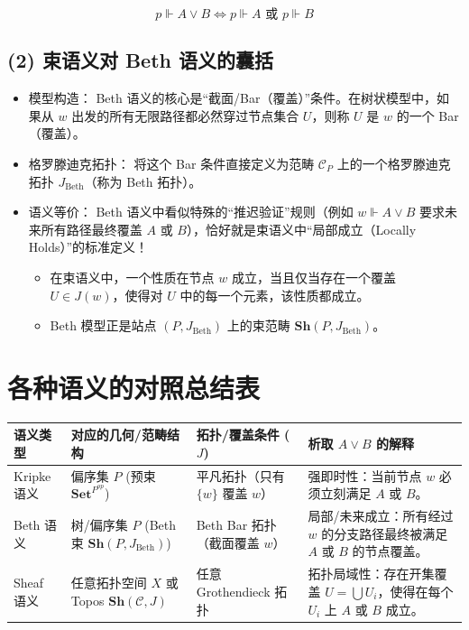 \documentclass[12pt,a4paper]{article}
\begin{document}
\[
p \Vdash A \lor B \iff p \Vdash A \text{ 或 } p \Vdash B
\]

\subsection{(2) 束语义对 Beth 语义的囊括}

\begin{itemize}
  \item 模型构造： Beth 语义的核心是“截面/Bar（覆盖）”条件。在树状模型中，如果从 $w$ 出发的所有无限路径都必然穿过节点集合 $U$，则称 $U$ 是 $w$ 的一个 Bar（覆盖）。
  \item 格罗滕迪克拓扑： 将这个 Bar 条件直接定义为范畴 $\mathcal{C}_P$ 上的一个格罗滕迪克拓扑 $J_{\text{Beth}}$（称为 Beth 拓扑）。
  \item 语义等价： Beth 语义中看似特殊的“推迟验证”规则（例如 $w \Vdash A \lor B$ 要求未来所有路径最终覆盖 $A$ 或 $B$），恰好就是束语义中“局部成立（Locally Holds）”的标准定义！
  \begin{itemize}
    \item 在束语义中，一个性质在节点 $w$ 成立，当且仅当存在一个覆盖 $U \in J(w)$，使得对 $U$ 中的每一个元素，该性质都成立。
    \item Beth 模型正是站点 $(P, J_{\text{Beth}})$ 上的束范畴 $\mathbf{Sh}(P, J_{\text{Beth}})$。
  \end{itemize}
\end{itemize}

\section{各种语义的对照总结表}

\begin{center}
\begin{tabular}{|p{2.2cm}|p{5.5cm}|p{3.8cm}|p{4.5cm}|}
\hline
\textbf{语义类型} & \textbf{对应的几何/范畴结构} & \textbf{拓扑/覆盖条件 ($J$)} & \textbf{析取 $A\lor B$ 的解释} \\
\hline
Kripke 语义 & 偏序集 $P$ (预束 $\mathbf{Set}^{P^{op}}$) & 平凡拓扑（只有 $\{w\}$ 覆盖 $w$） & 强即时性：当前节点 $w$ 必须立刻满足 $A$ 或 $B$。 \\
\hline
Beth 语义 & 树/偏序集 $P$ (Beth 束 $\mathbf{Sh}(P, J_{\text{Beth}})$) & Beth Bar 拓扑（截面覆盖 $w$） & 局部/未来成立：所有经过 $w$ 的分支路径最终被满足 $A$ 或 $B$ 的节点覆盖。 \\
\hline
Sheaf 语义 & 任意拓扑空间 $X$ 或 Topos $\mathbf{Sh}(\mathcal{C}, J)$ & 任意 Grothendieck 拓扑 & 拓扑局域性：存在开集覆盖 $U = \bigcup U_i$，使得在每个 $U_i$ 上 $A$ 或 $B$ 成立。 \\
\hline
\end{tabular}
\end{center}
\end{document}
